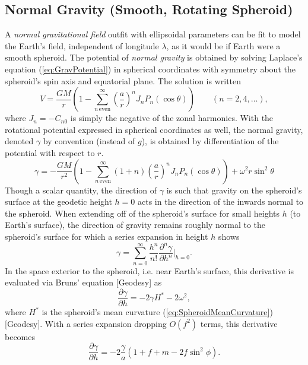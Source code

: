 \documentclass[11pt,dvipsnames]{thesis}
\begin{document}
\subsection{Normal Gravity (Smooth, Rotating Spheroid)}

A \textit{normal gravitational field} outfit with ellipsoidal parameters can be fit to model the Earth's field, independent of longitude $\lambda$, as it would be if Earth were a smooth spheroid.
The potential of \textit{normal gravity} is obtained by solving Laplace's equation (\ref{eq:GravPotential}) in spherical coordinates with symmetry about the spheroid's spin axis and equatorial plane. The solution is written
\begin{equation}
V = \frac{GM}{r}\left(1 - \sum_{n\,\text{even}}^\infty \left(\frac{a}{r}\right)^{\!n} J_n P_n(\cos\theta)\right) \qquad (n = 2,4,\ldots), \label{eq:NormalGravitationalPotential}
\end{equation}
where $J_n = -C_{n0}$ is simply the negative of the zonal harmonics.
With the rotational potential expressed in spherical coordinates as well, the normal gravity, denoted $\gamma$ by convention (instead of $g$), is obtained by differentiation of the potential with respect to $r$.
\begin{equation}
\gamma = -\frac{GM}{r^2} \left(1 - \sum_{n\,\text{even}}^\infty (1 + n) \left(\frac{a}{r}\right)^{\!n} J_n P_n(\cos\theta)\right) + \omega^2 r \sin^2\theta \label{eq:NormalGravityOnSpheroidSurface}
\end{equation}
Though a scalar quantity, the direction of $\gamma$ is such that gravity on the spheroid's surface at the geodetic height $h = 0$ acts in the direction of the inwards normal to the spheroid. When extending off of the spheroid's surface for small heights $h$ (to Earth's surface), the direction of gravity remains roughly normal to the spheroid's surface for which a series expansion in height $h$ shows
\begin{equation}
\gamma = \sum_{n = 0}^\infty \frac{h^n}{n!} \frac{\partial^n \gamma}{\partial h^n}\bigg\vert_{h=0}.
\end{equation}
In the space exterior to the spheroid, i.e. near Earth's surface, this derivative is evaluated via Bruns' equation [Geodesy] as
\begin{equation}
\frac{\partial\gamma}{\partial h} = -2\gamma H^* - 2\omega^2, \label{eq:BrunsEq}
\end{equation}
where $H^*$ is the spheroid's mean curvature (\ref{eq:SpheroidMeanCurvature}) [Geodesy]. With a series expansion dropping $\mathit{O}(f^2)$ terms, this derivative becomes
\begin{equation}
\frac{\partial \gamma}{\partial h} = -2 \frac{\gamma}{a}(1 + f + m - 2f\sin^2\phi).
\end{equation}
\end{document}
